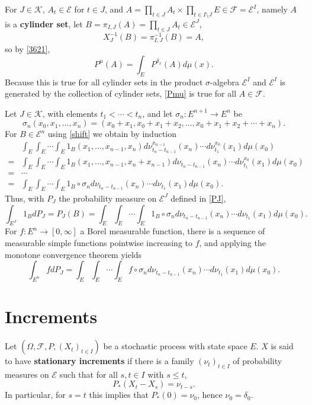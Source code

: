 \documentclass{article}
\theoremstyle{definition}
\begin{document}
For $J \in \mathscr{K}$, $A_t \in \mathscr{E}$ for $t \in J$, and $A = \prod_{t \in J} A_t \times \prod_{t \in I \setminus J} E \in \mathscr{F}=\mathscr{E}^I$, namely
$A$ is a \textbf{cylinder set},
let $B=\pi_{I,J}(A)=\prod_{t \in J} A_t \in \mathscr{E}^J$,
\[
X_J^{-1}(B) = \pi_{I,J}^{-1}(B) = A,
\]
so by \eqref{3621},
\begin{equation}
P^\mu(A) = \int_E P^{\delta_x}(A) d\mu(x).
\label{Pmu}
\end{equation}
Because this is true for all cylinder sets in the product $\sigma$-algebra $\mathscr{E}^I$ and
$\mathscr{E}^I$ is generated 
by the collection of cylinder sets,
\eqref{Pmu} is true for all $A \in \mathscr{F}$. 


Let $J \in \mathscr{K}$, with elements $t_1<\cdots<t_n$, 
and let $\sigma_n:E^{n+1} \to E^n$ be
\[
\sigma_n(x_0,x_1,\ldots,x_n) = (x_0+x_1,x_0+x_1+x_2,\ldots,x_0+x_1+x_2+\cdots+x_n).
\]
For $B \in \mathscr{E}^n$ using \eqref{shift} we obtain by induction
\[
\begin{split}
&\int_E \int_E \cdots \int_E 1_B(x_1,\ldots,x_{n-1},x_n) 
d\nu_{t_n-t_{n-1}}^{x_{n-1}}(x_n) \cdots d\nu_{t_1}^{x_0} (x_1) d\mu(x_0)\\
=&\int_E \int_E \cdots \int_E 1_B(x_1,\ldots,x_{n-1},x_n+x_{n-1}) d\nu_{t_n-t_{n-1}}(x_n) \cdots d\nu_{t_1}^{x_0} (x_1) d\mu(x_0)\\
=&\cdots\\
=&\int_E \int_E \cdots \int_E 1_B \circ \sigma_n d\nu_{t_n-t_{n-1}}(x_n) \cdots d\nu_{t_1}(x_1) d\mu(x_0).
\end{split}
\]
Thus, with $P_J$ the probability measure on $\mathscr{E}^J$ defined in \eqref{PJ},
\[
\int_{E^J} 1_B dP_J = P_J(B) = \int_E \int_E \cdots \int_E 1_B \circ \sigma_n d\nu_{t_n-t_{n-1}}(x_n) \cdots d\nu_{t_1}(x_1) d\mu(x_0).
\]
For $f:E^n \to [0,\infty]$ a Borel measurable function, there is a sequence of measurable simple functions pointwise increasing to $f$, and applying
the monotone convergence theorem yields 
\begin{equation}
\int_{E^n} f dP_J
=\int_E \int_E \cdots \int_E f \circ \sigma_n d\nu_{t_n-t_{n-1}}(x_n) \cdots d\nu_{t_1}(x_1) d\mu(x_0).
\label{373}
\end{equation}




\section{Increments}
Let $(\Omega,\mathscr{F},P,(X_t)_{t \in I})$ be a stochastic process 
with state space $E$. $X$ is said to have \textbf{stationary increments} if 
there is a family $(\nu_t)_{t \in I}$ of probability measures on $\mathscr{E}$ 
such that  for all $s,t \in I$ with $s \leq t$,
\[
P_*(X_t-X_s) = \nu_{t-s}.
\]
In particular, for $s=t$ this implies that $P_*(0)=\nu_0$, hence
$\nu_0=\delta_0$. 
\end{document}
